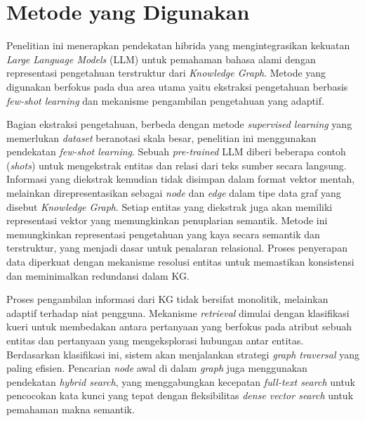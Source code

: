 \section{Metode yang Digunakan}
Penelitian ini menerapkan pendekatan hibrida yang mengintegrasikan kekuatan \textit{Large Language Models} (LLM) untuk pemahaman bahasa alami dengan representasi pengetahuan terstruktur dari \textit{Knowledge Graph}.
Metode yang digunakan berfokus pada dua area utama yaitu ekstraksi pengetahuan berbasis \textit{few-shot learning} dan mekanisme pengambilan pengetahuan yang adaptif.

Bagian ekstraksi pengetahuan, berbeda dengan metode \textit{supervised learning} yang memerlukan \textit{dataset} beranotasi skala besar, penelitian ini menggunakan pendekatan \textit{few-shot learning}.
Sebuah \textit{pre-trained} LLM diberi beberapa contoh (\textit{shots}) untuk mengekstrak entitas dan relasi dari teks sumber secara langsung.
Informasi yang diekstrak kemudian tidak disimpan dalam format vektor mentah, melainkan direpresentasikan sebagai \textit{node} dan \textit{edge} dalam tipe data graf yang disebut \textit{Knowledge Graph}.
Setiap entitas yang diekstrak juga akan memiliki representasi vektor yang memungkinkan penuplarian semantik.
Metode ini memungkinkan representasi pengetahuan yang kaya secara semantik dan terstruktur, yang menjadi dasar untuk penalaran relasional.
Proses penyerapan data diperkuat dengan mekanisme resolusi entitas untuk memastikan konsistensi dan meminimalkan redundansi dalam KG.

Proses pengambilan informasi dari KG tidak bersifat monolitik, melainkan adaptif terhadap niat pengguna.
Mekanisme \textit{retrieval} dimulai dengan klasifikasi kueri untuk membedakan antara pertanyaan yang berfokus pada atribut sebuah entitas dan pertanyaan yang mengeksplorasi hubungan antar entitas.
Berdasarkan klasifikasi ini, sistem akan menjalankan strategi \textit{graph traversal} yang paling efisien.
Pencarian \textit{node} awal di dalam \textit{graph} juga menggunakan pendekatan \textit{hybrid search}, yang menggabungkan kecepatan \textit{full-text search} untuk pencocokan kata kunci yang tepat dengan fleksibilitas \textit{dense vector search} untuk pemahaman makna semantik.

